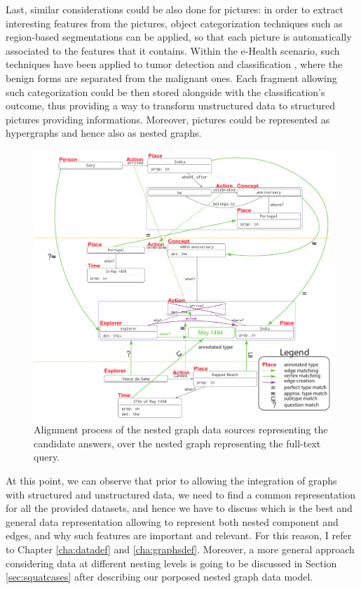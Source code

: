 Last, similar considerations could be also done for pictures: in order to extract interesting features from the pictures, object categorization techniques \cite{Galleguillos10} such as region-based segmentations \cite{NIPS2009_3766} can be applied, so that each picture is automatically associated to the features that it contains. Within the e-Health scenario, such techniques have been applied to tumor detection and classification \cite{Rouh15,Rouhi16}, where the benign forms are separated from the malignant ones. Each fragment allowing such categorization could be then stored alongside with the classification's outcome, thus providing a way to transform unstructured data to structured pictures providing informations. Moreover, pictures could be represented as hypergraphs \cite{Bretto2005} and hence also as nested graphs.

\begin{figure}
	\centering
	\includegraphics[width=.8\textheight]{fig/01dataint/GraphAlignWatson.pdf}
	\caption{Alignment process of the nested graph data sources representing the candidate answers, over the nested graph representing the full-text query.}
	\label{fig:aligninggraphs}
\end{figure}

At this point, we can observe that prior to allowing the integration of graphs with structured and unstructured data, we need to find a common representation for all the provided datasets, and hence we have to discuss which is the best and general data representation allowing to represent both nested component and edges, and why such features are important and relevant. For this reason, I refer to Chapter \vref{cha:datadef} and \vref{cha:graphsdef}. Moreover, a more general approach considering data at different nesting levels is going to be discussed in Section \vref{sec:squatcases} after describing our porposed nested graph data model.

